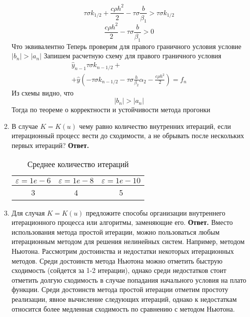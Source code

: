 \documentclass{article}
\begin{document}
\begin{enumerate}
\begin{equation*}
		\end{equation*}
		\begin{equation*}
			\tau \sigma k_{1/2} +  \frac{c \rho h^2}{2} -\tau \sigma \frac{b}{\beta_1} >  \tau \sigma k_{1/2}
		\end{equation*}
		\begin{equation*}
			\frac{c \rho h^2}{2} -\tau \sigma \frac{b}{\beta_1} >0
		\end{equation*}
		Что эквивалентно 
		Теперь проверим для правого граничного условия условие $|b_n| > |a_n|$
		Запишем расчетную схему для правого граничного условия
		\begin{gather*}
			\hat{y}_{n-1} \tau \sigma k_{n-1/2} +\\+  \hat{y} (-\tau \sigma k_{n-1/2} - \tau \sigma \frac{h}{\beta_2} \alpha_2 - \frac{c \rho h^2}{2}) = 
			f_n
		\end{gather*}
		Из схемы видно, что 
		\begin{equation*}
			|b_n| > |a_n|
		\end{equation*}
		Тогда по теореме о корректности и устойчивости метода прогонки 
		\item В случае $K = K(u)$ чему равно количество внутренних итераций, если итерационный процесс вести до сходимости,
		а не обрывать после нескольких первых итераций?
		\newline
		{\bfseries Ответ. } 
		\begin{table}[h]
			\centering
			\caption{Среднее количество итераций}
			\begin{tabular}{|c|c|c|}
				\hline
				$\varepsilon = 1e-6$ &$\varepsilon = 1e-8$& $\varepsilon = 1e-10$ \\
				\hline
				3& 4 & 5\\
				\hline
			\end{tabular}
		\end{table}
		\item Для случая $K = K(u)$ предложите способы организации
		внутреннего итерационного процесса или алгоритмы, заменяющие его.
		\newline
		{\bfseries Ответ. } 
		Вместо использования метода простой итерации, можно пользоваться любым итерационным методом 
		для решения нелинейных систем. Например, методом Ньютона.
		Рассмотрим достоинства и недостатки некоторых итерационных методов.
		Среди достоинств метода Ньютона можно отметить быструю сходимость (сойдется за 1-2 итерации), однако
		среди недостатков стоит отметить долгую сходимость в случае попадания начального условия на плато функции. 
		Среди достоинств метода простой итерации отметим простоту реализации, явное вычисление следующих итераций, однако 
		к недостаткам относится более медленная сходимость по сравнению с методом Ньютона. 

	\end{enumerate}
\end{document}
